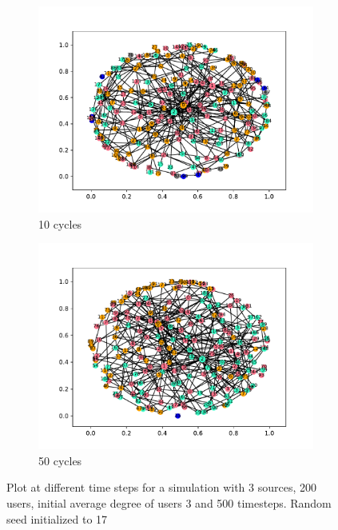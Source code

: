\begin{figure}
  \vspace{0cm}

  \begin{subfigure}[t]{.45\textwidth}
    \centering
    \includegraphics[trim={1cm .5cm 1cm 1cm}, clip, width=\linewidth]{img/pdf/plot-0010.pdf} 
    \caption{10 cycles} \label{fig:300}
  \end{subfigure}
  \begin{subfigure}[t]{.45\textwidth}
    \centering
    \includegraphics[trim={1cm .5cm 1cm 1cm}, clip, width=\linewidth]{img/pdf/plot-0050.pdf} 
    \caption{50 cycles} \label{fig:400}
  \end{subfigure}
 
  \caption{Plot at different time steps for a simulation with 3 sources, 200 users, initial average degree of users 3 and 500 timesteps. Random seed initialized to 17}
\end{figure}

